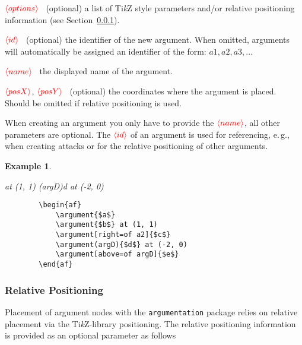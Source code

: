 \documentclass[headings=normal]{scrartcl}
\newcommand{\tikzname}{Ti\emph{k}Z\xspace}
\newcommand{\argumentation}{\texttt{argumentation}\xspace}
\newcommand{\opt}[2][red]{\ensuremath{\textcolor{#1}{\langle #2\rangle}}}
\newtheorem{example}{Example}
\begin{document}
    \begin{list}{}{\leftmargin=\parindent\rightmargin=0pt}
        \item\opt{options}~ (optional) a list of \tikzname style parameters and/or relative positioning information (see Section~\ref{sec:relpos}).
        \item\opt{id}~ (optional) the identifier of the new argument. When omitted, arguments will automatically be assigned an identifier of the form: $a1, a2, a3,...$
        \item\opt{name}~ the displayed name of the argument.
        \item\opt{posX}, \opt{posY}~ (optional) the coordinates where the argument is placed. Should be omitted if relative positioning is used.
        
        \item When creating an argument you only have to provide the \opt{name}, all other parameters are optional.
        The \opt{id} of an argument is used for referencing, e.\,g., when creating attacks or for the relative positioning of other arguments.
    \end{list}

\begin{example}~

    \begin{minipage}{0.35\textwidth}
    \begin{center}
        \begin{af}
             at (1, 1)
            \argument(argD){d} at (-2, 0)
        \end{af}
    \end{center}
    \end{minipage}
    \begin{minipage}{0.5\textwidth}
    \begin{verbatim}
        \begin{af}
            \argument{$a$}
            \argument{$b$} at (1, 1)
            \argument[right=of a2]{$c$}
            \argument(argD){$d$} at (-2, 0)
            \argument[above=of argD]{$e$}
        \end{af}
    \end{verbatim}
    \end{minipage}%
\end{example}

\subsubsection{Relative Positioning}\label{sec:relpos}
    Placement of argument nodes with the \argumentation package relies on relative placement via the \tikzname-library \textsf{positioning}.
    The relative positioning information is provided as an optional parameter as follows\\
\end{document}
